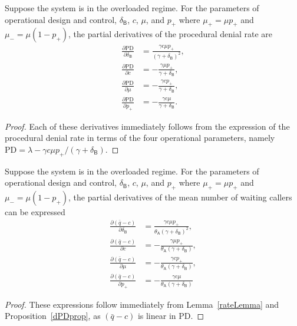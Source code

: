 \documentclass[manuscript,screen,authorversion]{acmart}
\begin{document}
\begin{proposition}\label{dPDprop}
Suppose the system is in the overloaded regime. For the parameters of operational design and control, $\delta_\mathsf{B}$, $c$, $\mu$, and $p_+$ where $\mu_+ = \mu p_+$ and $\mu_- = \mu(1-p_+)$, the partial derivatives of the procedural denial rate are
\begin{align}
\frac{\partial \mathrm{PD}}{\partial \delta_\mathsf{B}}
&=
\frac{\gamma c\mu p_+ }{(\gamma + \delta_\mathsf{B})^2}
,
\\
\frac{\partial \mathrm{PD}}{\partial c}
&=
-
\frac{\gamma \mu p_+}{\gamma + \delta_\mathsf{B}}
,
\\
\frac{\partial \mathrm{PD}}{\partial \mu}
&=
-
\frac{\gamma c p_+}{\gamma + \delta_\mathsf{B}}
,
\\
\frac{\partial \mathrm{PD}}{\partial p_+}
&=
-
\frac{\gamma c \mu}{\gamma + \delta_\mathsf{B}}
.
\end{align}
\end{proposition}
\begin{proof}
Each of these derivatives immediately follows from the expression of the procedural denial rate in terms of the four operational parameters, namely 
$\mathrm{PD}
=
\lambda
-
{\gamma c \mu p_+}/({\gamma + \delta_\mathsf{B}})$.
\end{proof}


\begin{proposition}\label{qNumWaitprop}
Suppose the system is in the overloaded regime. For the parameters of operational design and control, $\delta_\mathsf{B}$, $c$, $\mu$, and $p_+$ where $\mu_+ = \mu p_+$ and $\mu_- = \mu(1-p_+)$, the partial derivatives of the mean number of waiting callers can be expressed
\begin{align}
\frac{\partial (\bar q - c)}{\partial \delta_\mathsf{B}}
&=
\frac{\gamma c\mu p_+ }{\theta_\mathsf{A}(\gamma + \delta_\mathsf{B})^2}
,
\\
\frac{\partial(\bar q - c)}{\partial c}
&=
-
\frac{\gamma \mu p_+}{\theta_\mathsf{A}(\gamma + \delta_\mathsf{B})}
,
\\
\frac{\partial (\bar q - c)}{\partial \mu}
&=
-
\frac{\gamma c p_+}{\theta_\mathsf{A}(\gamma + \delta_\mathsf{B})}
,
\\
\frac{\partial (\bar q - c)}{\partial p_+}
&=
-
\frac{\gamma c \mu}{\theta_\mathsf{A}(\gamma + \delta_\mathsf{B})}
\end{align}
\end{proposition}
\begin{proof}
These expressions follow immediately from Lemma~\ref{rateLemma} and Proposition~\ref{dPDprop}, as $(\bar q - c)$ is linear in $\mathrm{PD}$.
\end{proof}
\end{document}
